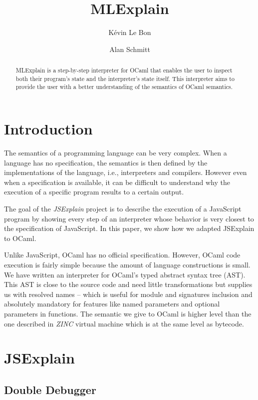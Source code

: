\documentclass[twocolumn]{article}
\author{ K\'evin Le Bon \and Alan Schmitt }
\title{MLExplain}
\begin{document}
\maketitle

\begin{abstract}
  MLExplain is a step-by-step interpreter for OCaml that enables the
  user to inspect both their program's state and the interpreter's state
  itself. This interpreter aims to provide the user with a better understanding
  of the semantics of OCaml semantics.
\end{abstract}

\section{Introduction}

The semantics of a programming language can be very complex. When a language
has no specification, the semantics is then defined by the implementations of
the language, i.e., interpreters and compilers. However even when a
specification is available, it can be difficult to understand why the execution
of a specific program results to a certain output.

The goal of the \emph{JSExplain} project \cite{chargueraud:hal-01745792} is to
describe the execution of a JavaScript program by showing every step of an
interpreter whose behavior is very closest to the specification of JavaScript.
In this paper, we show how we adapted JSExplain to OCaml.

Unlike JavaScript, OCaml has no official specification. However, OCaml code
execution is fairly simple because the amount of language constructions is
small. We have written an interpreter for OCaml's typed abstract syntax tree
(AST). This AST is close to the source code and need little transformations but
supplies us with resolved names -- which is useful for module and signatures
inclusion and absolutely mandatory for features like named parameters and
optional parameters in functions. The semantic we give to OCaml is higher level
than the one described in \emph{ZINC} \cite{Leroy-ZINC} virtual machine which is
at the same level as bytecode.

\section{JSExplain}

\subsection{Double Debugger}
\label{subsec:double-debugger}
\end{document}
